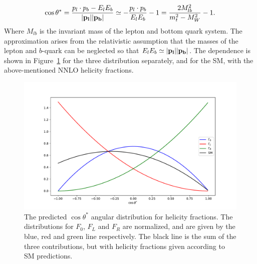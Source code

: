 \documentclass[12pt,a4paper]{article}
\numberwithin{equation}{section}
\begin{document}
\begin{equation}
  \cos \theta^*=\frac{p_l\cdot p_b-E_lE_b}{\abs{\vb{p_l}}\abs{\vb{p_b}}}\\
  \simeq -\frac{p_l\cdot p_b}{E_lE_b} - 1 = \frac{2 M_{lb}^2}{m_t^2 - M_W^2} - 1. \label{eq:costheta}
\end{equation}
Where $M_{lb}$ is the invariant mass of the lepton and bottom quark system. The
approximation arises from the relativistic assumption that the masses of the
lepton and $b$-quark can be neglected so that
$E_lE_b\simeq \abs{\vb{p_l}}\abs{\vb{p_b}}$. The dependence is shown in
Figure~\ref{fig:distributions} for the three distribution separately, and for the
SM, with the above-mentioned NNLO helicity fractions.
\begin{figure}[H]
  \centering
	\includegraphics[width=0.7\linewidth]{figures/angular_dist.pdf}
	\caption{The predicted $\cos \theta^{*}$ angular distribution for helicity
    fractions. The distributions for $F_{0}$, $F_{L}$ and $F_{R}$ are
    normalized, and are given by the blue, red and green line respectively. The
    black line is the sum of the three contributions, but with helicity
    fractions given according to SM predictions.}\label{fig:distributions}
\end{figure}
\end{document}

